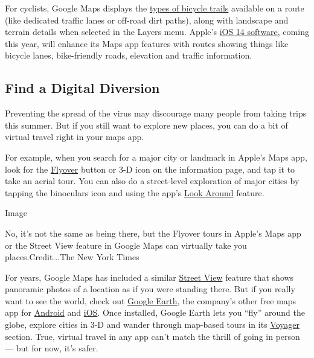 For cyclists, Google Maps displays the
\href{https://support.google.com/maps/answer/3092439?co=GENIE.Platform\%3DAndroid\&hl=en\&oco=1}{types
of bicycle trails} available on a route (like dedicated traffic lanes or
off-road dirt paths), along with landscape and terrain details when
selected in the Layers menu. Apple's
\href{https://www.apple.com/ios/ios-14-preview/features/}{iOS 14
software}, coming this year, will enhance its Maps app features with
routes showing things like bicycle lanes, bike-friendly roads, elevation
and traffic information.

\hypertarget{find-a-digital-diversion}{%
\subsection{Find a Digital Diversion}\label{find-a-digital-diversion}}

Preventing the spread of the virus may discourage many people from
taking trips this summer. But if you still want to explore new places,
you can do a bit of virtual travel right in your maps app.

For example, when you search for a major city or landmark in Apple's
Maps app, look for the
\href{https://support.apple.com/guide/iphone/take-flyover-tours-in-maps-iph81a3f978/ios}{Flyover}
button or 3-D icon on the information page, and tap it to take an aerial
tour. You can also do a street-level exploration of major cities by
tapping the binoculars icon and using the app's
\href{https://support.apple.com/guide/iphone/look-around-iph65703a702/ios}{Look
Around} feature.

Image

No, it's not the same as being there, but the Flyover tours in Apple's
Maps app or the Street View feature in Google Maps can virtually take
you places.Credit...The New York Times

For years, Google Maps has included a similar
\href{https://support.google.com/maps/answer/3093484?co=GENIE.Platform\%3DAndroid\&hl=en\&oco=1}{Street
View} feature that shows panoramic photos of a location as if you were
standing there. But if you really want to see the world, check out
\href{https://www.google.com/earth/versions/\#earth-for-mobile}{Google
Earth}, the company's other free maps app for
\href{https://play.google.com/store/apps/details?id=com.google.earth\&hl=en_US}{Android}
and \href{https://apps.apple.com/us/app/google-earth/id293622097}{iOS}.
Once installed, Google Earth lets you ``fly'' around the globe, explore
cities in 3-D and wander through map-based tours in its
\href{https://support.google.com/earth/answer/7365064?hl=en\&ref_topic=7364880\&co=GENIE.Platform\%3DAndroid\&oco=1}{Voyager}
section. True, virtual travel in any app can't match the thrill of going
in person --- but for now, it's safer.

